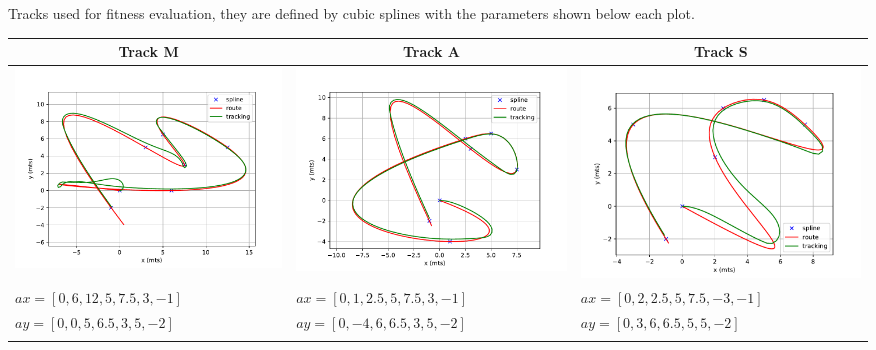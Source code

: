 \documentclass[symmetry,article,submit,moreauthors,pdftex]{Definitions/mdpi}
\begin{document}
\begin{specialtable}[H] 
\small
\caption{Tracks used for fitness evaluation, they are defined by cubic splines with the parameters shown below each plot.\label{tab:routes}}
\begin{tabular}{lll}
\toprule
\multicolumn{1}{c}{\textbf{Track M}}		& \multicolumn{1}{c}{\textbf{Track A}}& \multicolumn{1}{c}{\textbf{Track S}}\\
\midrule
\includegraphics[scale=0.23]{img/M.pdf}& \includegraphics[scale=0.23]{img/A.pdf} & \includegraphics[scale=0.23]{img/S.pdf}\\
  $ax=[0,6,12,5,7.5,3,-1]$	&$ax = [0, 1, 2.5, 5, 7.5, 3, -1] $& $ ax = [0, 2, 2.5, 5, 7.5, -3, -1]$\\
  $ay = [0, 0,  5, 6.5, 3, 5, -2]  $	&$ay = [0, -4, 6, 6.5, 3, 5, -2] $& $ ay = [0, 3, 6, 6.5, 5, 5, -2] $\\
\bottomrule
\e
\end{tabular}
\end{specialtable}
\end{document}
